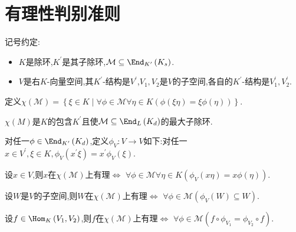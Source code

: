 \section{有理性判别准则}

记号约定:

\begin{itemize}
	\item $K$是除环,$K^{\prime}$是其子除环,$\mathcal{M}\subseteq\End_{K^{\prime}}\left(K_{s}\right)$.
	\item $V$是右$K$-向量空间,其$K^{\prime}$-结构是$V^{\prime}$,$V_{1},V_{2}$是$V$的子空间,各自的$K^{\prime}$-结构是$V_{1}^{\prime},V_{2}^{\prime}$.
\end{itemize}

\begin{definition}{}{}
	定义$\chi\left(\mathcal{M}\right)=\left\{\xi\in K\middle|\forall\phi\in\mathcal{M}\forall\eta\in K\left(\phi\left(\xi\eta\right)=\xi\phi\left(\eta\right)\right)\right\}$.
\end{definition}

\begin{remark}{}{}
	$\chi\left(M\right)$是$K$的包含$K^{\prime}$且使$\mathcal{M}\subseteq\End_{L}\left(K_{d}\right)$的最大子除环.
\end{remark}

\begin{definition}{}{}
	对任一$\phi\in\End_{K^{\prime}}\left(K_{d}\right)$,定义$\phi_{V}:V\to V$如下:对任一$x\in V^{\prime},\xi\in K,\phi_{V}\left(x^{\prime}\xi\right)=x^{\prime}\phi_{V}\left(\xi\right)$.
\end{definition}

\begin{proposition}{}{}
	设$x\in V$,则$x$在$\chi\left(\mathcal{M}\right)$上有理$\iff$ $\forall\phi\in\mathcal{M}\forall\eta\in K\left(\phi_{V}\left(x\eta\right)=x\phi\left(\eta\right)\right)$.
\end{proposition}

\begin{proposition}{}{}
	设$W$是$V$的子空间,则$W$在$\chi\left(\mathcal{M}\right)$上有理$\iff$ $\forall\phi\in\mathcal{M}\left(\phi_{V}\left(W\right)\subseteq W\right)$.
\end{proposition}

\begin{proposition}{}{}
	设$f\in\Hom_{K}\left(V_{1},V_{2}\right)$,则$f$在$\chi\left(\mathcal{M}\right)$上有理$\iff$ $\forall\phi\in\mathcal{M}\left(f\circ\phi_{V_{1}}=\phi_{V_{2}}\circ f\right)$.
\end{proposition}